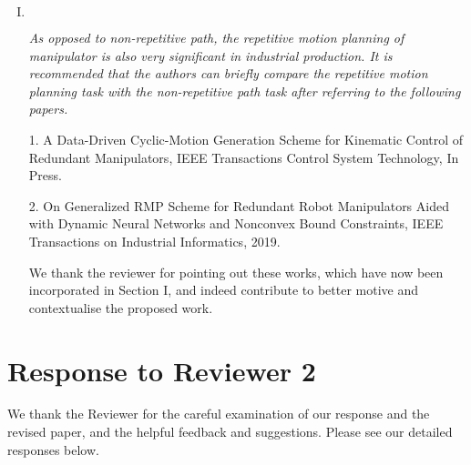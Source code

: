 \documentclass[11pt]{article}
\newenvironment{reviewer}
{\begin{mdframed}[roundcorner = 10pt,fontcolor=blue!70!black]\itshape}
{\end{mdframed}}
\begin{document}
\begin{enumerate}[I.]
  \item $ $
  \begin{reviewer}
   As opposed to non-repetitive path, the repetitive motion planning of manipulator is also very significant in industrial production. It is recommended that the authors can briefly compare the repetitive motion planning task with the non-repetitive path task after referring to the following papers.

1. A Data-Driven Cyclic-Motion Generation Scheme for Kinematic Control of Redundant Manipulators, IEEE Transactions Control System Technology, In Press.

2. On Generalized RMP Scheme for Redundant Robot Manipulators Aided with Dynamic Neural Networks and Nonconvex Bound Constraints, IEEE Transactions on Industrial Informatics, 2019.
  \end{reviewer}
  \noindent We thank the reviewer for pointing out these works, which have now been incorporated in Section I, and indeed contribute to better motive and contextualise the proposed work. 
  
\end{enumerate}

\clearpage

\section*{Response to Reviewer 2}
We thank the Reviewer for the careful examination of our response and the revised paper, and the helpful feedback and suggestions. Please see our detailed responses below.
\end{document}
